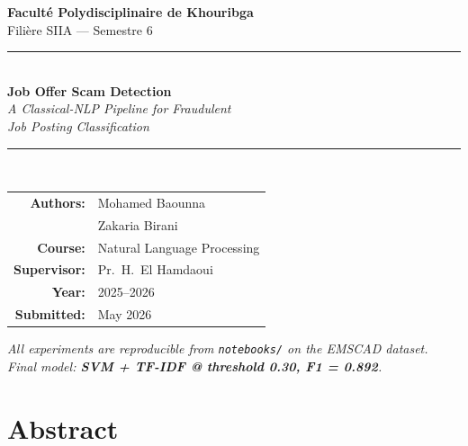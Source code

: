 \documentclass[11pt,a4paper]{article}
\begin{document}

\begin{titlepage}
    \centering
    \vspace*{1.5cm}

    {\Large \textbf{Faculté Polydisciplinaire de Khouribga}}\\[0.3cm]
    {\large Filière SIIA --- Semestre 6}\\[2cm]

    \rule{\linewidth}{0.6pt}\\[0.6cm]
    {\Huge \textbf{Job Offer Scam Detection}}\\[0.4cm]
    {\Large \textit{A Classical-NLP Pipeline for Fraudulent\\ Job Posting Classification}}\\[0.4cm]
    \rule{\linewidth}{0.6pt}\\[2cm]

    \begin{tabular}{rl}
        \textbf{Authors:}    & Mohamed Baounna \\[0.3em]
                             & Zakaria Birani \\[0.3em]
        \textbf{Course:}     & Natural Language Processing \\[0.3em]
        \textbf{Supervisor:} & Pr.\ H.\ El Hamdaoui \\[0.3em]
        \textbf{Year:}       & 2025--2026 \\[0.3em]
        \textbf{Submitted:}  & May 2026 \\
    \end{tabular}

    \vfill

    {\small \textit{All experiments are reproducible from \texttt{notebooks/} on the EMSCAD dataset.\\
    Final model: \textbf{SVM + TF-IDF @ threshold 0.30, F1 = 0.892}.}}
\end{titlepage}

\tableofcontents
\newpage

\section*{Abstract}
\end{document}
